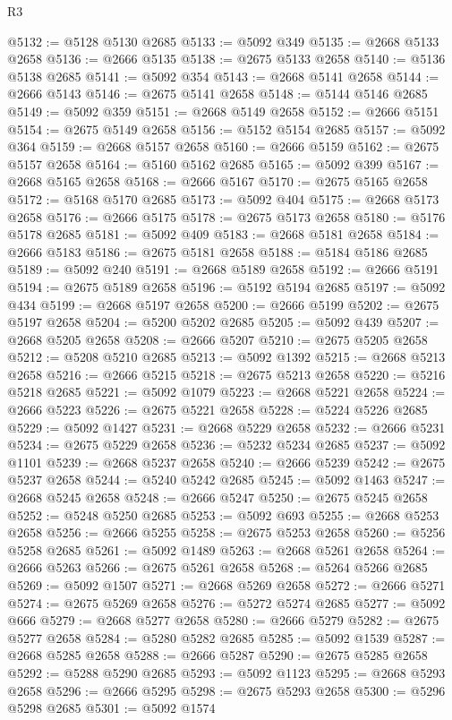 \begin{lexlean}{R3}
\begin{coremodule}
@5132 := @5128 @5130 @2685
@5133 := @5092 @349
@5135 := @2668 @5133 @2658
@5136 := @2666 @5135
@5138 := @2675 @5133 @2658
@5140 := @5136 @5138 @2685
@5141 := @5092 @354
@5143 := @2668 @5141 @2658
@5144 := @2666 @5143
@5146 := @2675 @5141 @2658
@5148 := @5144 @5146 @2685
@5149 := @5092 @359
@5151 := @2668 @5149 @2658
@5152 := @2666 @5151
@5154 := @2675 @5149 @2658
@5156 := @5152 @5154 @2685
@5157 := @5092 @364
@5159 := @2668 @5157 @2658
@5160 := @2666 @5159
@5162 := @2675 @5157 @2658
@5164 := @5160 @5162 @2685
@5165 := @5092 @399
@5167 := @2668 @5165 @2658
@5168 := @2666 @5167
@5170 := @2675 @5165 @2658
@5172 := @5168 @5170 @2685
@5173 := @5092 @404
@5175 := @2668 @5173 @2658
@5176 := @2666 @5175
@5178 := @2675 @5173 @2658
@5180 := @5176 @5178 @2685
@5181 := @5092 @409
@5183 := @2668 @5181 @2658
@5184 := @2666 @5183
@5186 := @2675 @5181 @2658
@5188 := @5184 @5186 @2685
@5189 := @5092 @240
@5191 := @2668 @5189 @2658
@5192 := @2666 @5191
@5194 := @2675 @5189 @2658
@5196 := @5192 @5194 @2685
@5197 := @5092 @434
@5199 := @2668 @5197 @2658
@5200 := @2666 @5199
@5202 := @2675 @5197 @2658
@5204 := @5200 @5202 @2685
@5205 := @5092 @439
@5207 := @2668 @5205 @2658
@5208 := @2666 @5207
@5210 := @2675 @5205 @2658
@5212 := @5208 @5210 @2685
@5213 := @5092 @1392
@5215 := @2668 @5213 @2658
@5216 := @2666 @5215
@5218 := @2675 @5213 @2658
@5220 := @5216 @5218 @2685
@5221 := @5092 @1079
@5223 := @2668 @5221 @2658
@5224 := @2666 @5223
@5226 := @2675 @5221 @2658
@5228 := @5224 @5226 @2685
@5229 := @5092 @1427
@5231 := @2668 @5229 @2658
@5232 := @2666 @5231
@5234 := @2675 @5229 @2658
@5236 := @5232 @5234 @2685
@5237 := @5092 @1101
@5239 := @2668 @5237 @2658
@5240 := @2666 @5239
@5242 := @2675 @5237 @2658
@5244 := @5240 @5242 @2685
@5245 := @5092 @1463
@5247 := @2668 @5245 @2658
@5248 := @2666 @5247
@5250 := @2675 @5245 @2658
@5252 := @5248 @5250 @2685
@5253 := @5092 @693
@5255 := @2668 @5253 @2658
@5256 := @2666 @5255
@5258 := @2675 @5253 @2658
@5260 := @5256 @5258 @2685
@5261 := @5092 @1489
@5263 := @2668 @5261 @2658
@5264 := @2666 @5263
@5266 := @2675 @5261 @2658
@5268 := @5264 @5266 @2685
@5269 := @5092 @1507
@5271 := @2668 @5269 @2658
@5272 := @2666 @5271
@5274 := @2675 @5269 @2658
@5276 := @5272 @5274 @2685
@5277 := @5092 @666
@5279 := @2668 @5277 @2658
@5280 := @2666 @5279
@5282 := @2675 @5277 @2658
@5284 := @5280 @5282 @2685
@5285 := @5092 @1539
@5287 := @2668 @5285 @2658
@5288 := @2666 @5287
@5290 := @2675 @5285 @2658
@5292 := @5288 @5290 @2685
@5293 := @5092 @1123
@5295 := @2668 @5293 @2658
@5296 := @2666 @5295
@5298 := @2675 @5293 @2658
@5300 := @5296 @5298 @2685
@5301 := @5092 @1574

\end{coremodule}
\end{lexlean}
